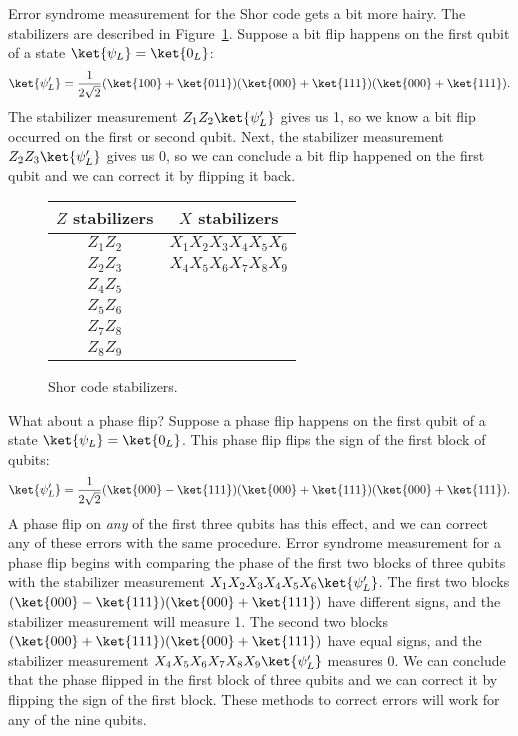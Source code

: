 Error syndrome measurement for the Shor code gets a bit more hairy. The stabilizers are described in Figure~\ref{fig:shor_stabilizers}. Suppose a bit flip happens on the first qubit of a state $\ket{\psi_L} = \ket{0_L}$:
\begin{equation}
  \ket{\psi_L'} = \dfrac{1}{2\sqrt 2}(\ket{100} + \ket{011})(\ket{000} + \ket{111})(\ket{000} + \ket{111}).
\end{equation}
The stabilizer measurement $Z_1Z_2\ket{\psi_L'}$ gives us 1, so we know a bit flip occurred on the first or second qubit. Next, the stabilizer measurement $Z_2Z_3\ket{\psi_L'}$ gives us 0, so we can conclude a bit flip happened on the first qubit and we can correct it by flipping it back.
\begin{figure}[ht]
  \centering
  \begin{tabular}{c|c}
    $Z$ stabilizers & $X$ stabilizers \\ \hline
    $Z_1Z_2$ & $X_1X_2X_3X_4X_5X_6$ \\
    $Z_2Z_3$ & $X_4X_5X_6X_7X_8X_9$ \\
    $Z_4Z_5$ &  \\
    $Z_5Z_6$ &  \\
    $Z_7Z_8$ &  \\
    $Z_8Z_9$ &  \\
  \end{tabular}
  \caption{Shor code stabilizers.}
  \label{fig:shor_stabilizers}
\end{figure}

What about a phase flip? Suppose a phase flip happens on the first qubit of a state $\ket{\psi_L} = \ket{0_L}$. This phase flip flips the sign of the first block of qubits:
\begin{equation}
  \ket{\psi_L'} = \dfrac{1}{2\sqrt 2}(\ket{000} - \ket{111})(\ket{000} + \ket{111})(\ket{000} + \ket{111}).
\end{equation}
A phase flip on \emph{any} of the first three qubits has this effect, and we can correct any of these errors with the same procedure. Error syndrome measurement for a phase flip begins with comparing the phase of the first two blocks of three qubits with the stabilizer measurement $X_1X_2X_3X_4X_5X_6\ket{\psi_L'}$. The first two blocks $(\ket{000} - \ket{111})(\ket{000} + \ket{111})$ have different signs, and the stabilizer measurement will measure 1. The second two blocks $(\ket{000} + \ket{111})(\ket{000} + \ket{111})$ have equal signs, and the stabilizer measurement $X_4X_5X_6X_7X_8X_9\ket{\psi_L'}$ measures 0. We can conclude that the phase flipped in the first block of three qubits and we can correct it by flipping the sign of the first block. These methods to correct errors will work for any of the nine qubits.

